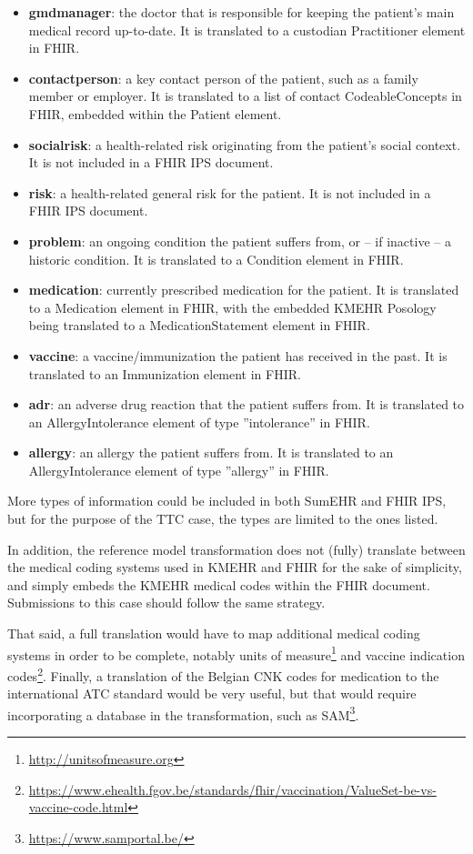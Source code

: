 \documentclass[
twocolumn,
]{ceurart}
\begin{document}
\begin{itemize}
\item \textbf{gmdmanager}: the doctor that is responsible for keeping the
  patient's main medical record up-to-date. It is translated to a custodian
  Practitioner element in FHIR.
\item \textbf{contactperson}: a key contact person of the patient, such
  as a family member or employer. It is translated to a list of contact
  CodeableConcepts in FHIR, embedded within the Patient element.
\item \textbf{socialrisk}: a health-related risk originating from the
  patient's social context. It is not included in a FHIR IPS document.
\item \textbf{risk}: a health-related general risk for the patient.
   It is not included in a FHIR IPS document.
\item \textbf{problem}: an ongoing condition the patient suffers from,
  or -- if inactive -- a historic condition. It is translated to a
  Condition element in FHIR.
\item \textbf{medication}: currently prescribed medication for the patient.
  It is translated to a Medication element in FHIR, with the embedded
  KMEHR Posology being translated to a MedicationStatement element in
  FHIR.
\item \textbf{vaccine}: a vaccine/immunization the patient has received
  in the past. It is translated to an Immunization element in FHIR.
\item \textbf{adr}: an adverse drug reaction that the patient suffers from.
  It is translated to an AllergyIntolerance element of type ''intolerance''
  in FHIR.
\item \textbf{allergy}: an allergy the patient suffers from.
  It is translated to an AllergyIntolerance element of type ''allergy''
  in FHIR.
\end{itemize}

More types of information could be included in both SumEHR and FHIR IPS, but
for the purpose of the TTC case, the types are limited to the ones listed.

In addition, the reference model transformation does not (fully) translate
between the medical coding systems used in KMEHR and FHIR for the sake of
simplicity, and simply embeds the KMEHR medical codes within the FHIR document.
Submissions to this case should follow the same strategy.

That said, a full translation would have to map additional medical
coding systems in order to be complete, notably units of
measure\footnote{\url{http://unitsofmeasure.org}} and vaccine indication
codes\footnote{\url{https://www.ehealth.fgov.be/standards/fhir/vaccination/ValueSet-be-vs-vaccine-code.html}}.
Finally, a translation of the Belgian CNK codes for medication to the
international ATC standard would be very useful, but that would require
incorporating a database in the transformation, such as SAM\footnote{\url{https://www.samportal.be/}}.
\end{document}
